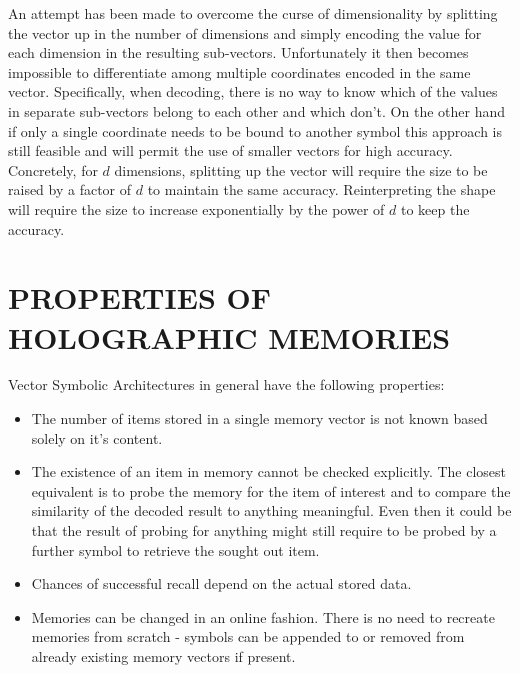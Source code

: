 \documentclass[a4paper,twoside]{article}
\begin{document}
		An attempt has been made to overcome the curse of dimensionality by splitting the vector up in the number of dimensions and simply encoding the value for each dimension in the resulting sub-vectors. Unfortunately it then becomes impossible to differentiate among multiple coordinates encoded in the same vector. Specifically, when decoding, there is no way to know which of the values in separate sub-vectors belong to each other and which don't. On the other hand if only a single coordinate needs to be bound to another symbol this approach is still feasible and will permit the use of smaller vectors for high accuracy. Concretely, for $d$ dimensions, splitting up the vector will require the size to be raised by a factor of $d$ to maintain the same accuracy. Reinterpreting the shape will require the size to increase exponentially by the power of $d$ to keep the accuracy.
			
	\newpage			
			
	\section{PROPERTIES OF HOLOGRAPHIC MEMORIES}
	
	Vector Symbolic Architectures in general have the following properties:
	\begin{itemize}
		\item The number of items stored in a single memory vector is not known based solely on it's content.
		\item The existence of an item in memory cannot be checked explicitly. The closest equivalent is to probe the memory for the item of interest and to compare the similarity of the decoded result to anything meaningful. Even then it could be that the result of probing for anything might still require to be probed by a further symbol to retrieve the sought out item.
		\item Chances of successful recall depend on the actual stored data.
		\item Memories can be changed in an online fashion. There is no need to recreate memories from scratch - symbols can be appended to or removed from already existing memory vectors if present.
	\end{itemize}
	
\end{document}
